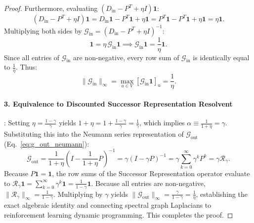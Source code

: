 \documentclass[11pt,a4paper]{article}
\begin{document}
\begin{proof}
Furthermore, evaluating $(D_{\text{in}} - P^T + \eta I) \mathbf{1}$:
\begin{equation}
(D_{\text{in}} - P^T + \eta I) \mathbf{1} = D_{\text{in}} \mathbf{1} - P^T \mathbf{1} + \eta \mathbf{1} = P^T \mathbf{1} - P^T \mathbf{1} + \eta \mathbf{1} = \eta \mathbf{1}.
\end{equation}
Multiplying both sides by $\mathcal{G}_{\text{in}} = (D_{\text{in}} - P^T + \eta I)^{-1}$:
\begin{equation}
\mathbf{1} = \eta \, \mathcal{G}_{\text{in}} \mathbf{1} \implies \mathcal{G}_{\text{in}} \mathbf{1} = \frac{1}{\eta} \mathbf{1}.
\end{equation}
Since all entries of $\mathcal{G}_{\text{in}}$ are non-negative, every row sum of $\mathcal{G}_{\text{in}}$ is identically equal to $\frac{1}{\eta}$. Thus:
\begin{equation}
\|\mathcal{G}_{\text{in}}\|_\infty = \max_{u \in V} [\mathcal{G}_{\text{in}} \mathbf{1}]_u = \frac{1}{\eta}.
\end{equation}

\paragraph{3. Equivalence to Discounted Successor Representation Resolvent}:
Setting $\eta = \frac{1 - \gamma}{\gamma}$ yields $1 + \eta = 1 + \frac{1 - \gamma}{\gamma} = \frac{1}{\gamma}$, which implies $\alpha \equiv \frac{1}{1 + \eta} = \gamma$. Substituting this into the Neumann series representation of $\mathcal{G}_{\text{out}}$ (Eq.~\eqref{eq:g_out_neumann}):
\begin{equation}
\mathcal{G}_{\text{out}} = \frac{1}{1 + \eta} \left( I - \frac{1}{1 + \eta} P \right)^{-1} = \gamma (I - \gamma P)^{-1} = \gamma \sum_{k=0}^\infty \gamma^k P^k = \gamma \mathcal{R}_\gamma.
\end{equation}
Because $P \mathbf{1} = \mathbf{1}$, the row sums of the Successor Representation operator evaluate to $\mathcal{R}_\gamma \mathbf{1} = \sum_{k=0}^\infty \gamma^k \mathbf{1} = \frac{1}{1 - \gamma} \mathbf{1}$. Because all entries are non-negative, $\|\mathcal{R}_\gamma\|_\infty = \frac{1}{1 - \gamma}$. Multiplying by $\gamma$ yields $\|\mathcal{G}_{\text{out}}\|_\infty = \frac{\gamma}{1 - \gamma} = \frac{1}{\eta}$, establishing the exact algebraic identity and connecting spectral graph Laplacians to reinforcement learning dynamic programming.
This completes the proof.
\end{proof}
\end{document}
